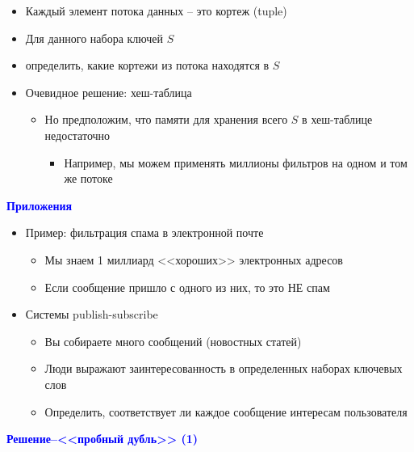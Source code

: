\documentclass[landscape]{slides}
\begin{document}
\begin{normalsize}
\begin{slide}
\begin{itemize}
\item Каждый элемент потока данных -- это кортеж (tuple)
\item Для данного набора ключей $S$
\item определить, какие кортежи из потока находятся в $S$
\item Очевидное решение: хеш-таблица
  \begin{itemize}
  \item Но предположим, что памяти для хранения всего $S$ в хеш-таблице недостаточно
    \begin{itemize}
    \item Например, мы можем применять миллионы фильтров на одном и том же потоке
    \end{itemize}
  \end{itemize}
\end{itemize}
\end{slide}


\begin{slide}
\textbf{\textcolor{blue}{Приложения}}

\begin{itemize}
\item Пример: фильтрация спама в электронной почте
  \begin{itemize}
  \item Мы знаем 1 миллиард <<хороших>> электронных адресов
  \item Если сообщение пришло с одного из них, то это НЕ спам
  \end{itemize}
\item Системы publish-subscribe
  \begin{itemize}
  \item Вы собираете много сообщений (новостных статей)
  \item Люди выражают заинтересованность в определенных наборах ключевых слов
  \item Определить, соответствует ли каждое сообщение интересам пользователя
  \end{itemize}
\end{itemize}
\end{slide}



\begin{slide}
\textbf{\textcolor{blue}{Решение--<<пробный дубль>> (1)}}


\end{slide}
\end{normalsize}
\end{document}
